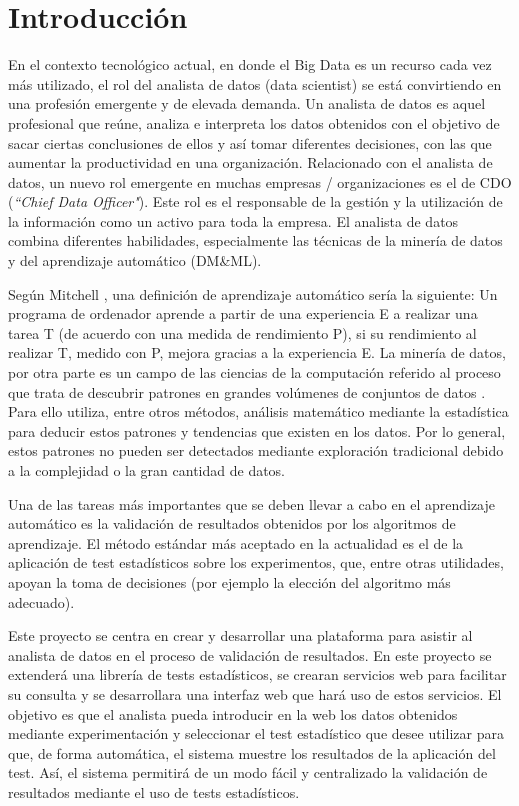 
\chapter{Introducción}
En el contexto tecnológico actual, en donde el Big Data es un recurso cada vez más utilizado, el rol
del analista de datos (data scientist) se está convirtiendo en una profesión emergente y de elevada
demanda. Un analista de datos es aquel profesional que reúne, analiza e interpreta los datos obtenidos
con el objetivo de sacar ciertas conclusiones de ellos y así tomar diferentes decisiones, con las que
aumentar la productividad en una organización. Relacionado con el analista de datos, un nuevo rol emergente
en muchas empresas / organizaciones es el de CDO (\textit{``Chief Data Officer"}). Este rol es el
responsable de la gestión y la utilización de la información como un activo para toda la empresa. El
analista de datos combina diferentes habilidades, especialmente las técnicas de la minería de datos y del
aprendizaje automático (DM\&ML).

Según Mitchell \cite{mitchell}, una definición de aprendizaje automático sería la siguiente: Un programa
de ordenador aprende a partir de una experiencia E a realizar una tarea T (de acuerdo con una medida de
rendimiento P), si su rendimiento al realizar T, medido con P, mejora gracias a la experiencia E. La
minería de datos, por otra parte es un campo de las ciencias de la computación referido al proceso que trata
de descubrir patrones en grandes volúmenes de conjuntos de datos \cite{mineria}. Para ello utiliza, entre
otros métodos, análisis matemático mediante la estadística para deducir estos patrones y tendencias que
existen en los datos. Por lo general, estos patrones no pueden ser detectados mediante exploración tradicional
debido a la complejidad o la gran cantidad de datos.

Una de las tareas más importantes que se deben llevar a cabo en el aprendizaje automático es la
validación de resultados obtenidos por los algoritmos de aprendizaje. El método estándar más aceptado
en la actualidad es el de la aplicación de test estadísticos sobre los experimentos, que, entre otras
utilidades, apoyan la toma de decisiones (por ejemplo la elección del algoritmo más adecuado).

Este proyecto se centra en crear y desarrollar una plataforma para asistir al analista de
datos en el proceso de validación de resultados. En este proyecto se extenderá una librería de tests
estadísticos, se crearan servicios web para facilitar su consulta y se desarrollara una interfaz web
que hará uso de estos servicios. El objetivo es que el analista pueda introducir en la web los datos obtenidos
mediante experimentación y seleccionar el test estadístico que desee utilizar para que, de forma automática, el
sistema muestre los resultados de la aplicación del test. Así, el sistema permitirá de un modo fácil y
centralizado la validación de resultados mediante el uso de tests estadísticos.

